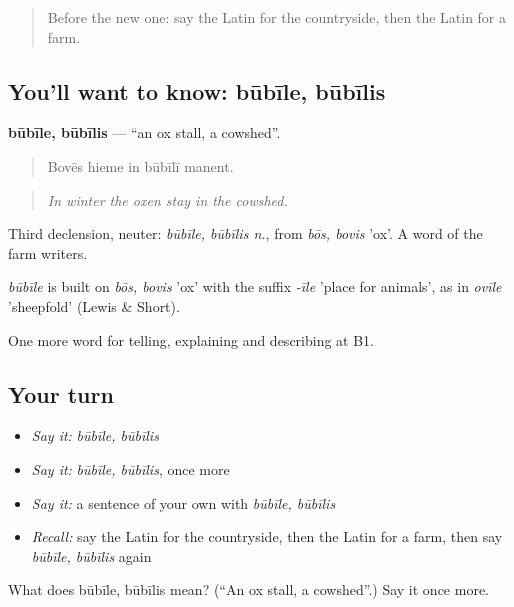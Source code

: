 \label{lesson:LA-C473-bubile}



\begin{quote}
Before the new one: say the Latin for the countryside, then the Latin for a farm.
\end{quote}

\subsection*{You'll want to know: būbīle, būbīlis}
\textbf{būbīle, būbīlis} — \textquotedblleft{}an ox stall, a cowshed\textquotedblright{}.

\begin{quote}
Bovēs hieme in būbīlī manent.
\end{quote}

\begin{quote}
\emph{In winter the oxen stay in the cowshed.}
\end{quote}

Third declension, neuter: \emph{būbīle, būbīlis n.}, from \emph{bōs, bovis} 'ox'. A word of the farm writers.

\begin{cousinweb}
\emph{būbīle} is built on \emph{bōs, bovis} 'ox' with the suffix \emph{-īle} 'place for animals', as in \emph{ovīle} 'sheepfold' (Lewis \& Short).
\end{cousinweb}

\begin{grammarlens}[title={What you've built}]
One more word for telling, explaining and describing at B1.
\end{grammarlens}

\subsection*{Your turn}
\begin{itemize}
\raggedright
  \item \emph{Say it:} \emph{būbīle, būbīlis}
  \item \emph{Say it:} \emph{būbīle, būbīlis}, once more
  \item \emph{Say it:} a sentence of your own with \emph{būbīle, būbīlis}
  \item \emph{Recall:} say the Latin for the countryside, then the Latin for a farm, then say \emph{būbīle, būbīlis} again
\end{itemize}

\begin{tcolorbox}[breakable,colback=teal!4,colframe=teal!35!black,title={Before you move on}]
What does būbīle, būbīlis mean? (\textquotedblleft{}An ox stall, a cowshed\textquotedblright{}.) Say it once more.
\end{tcolorbox}
